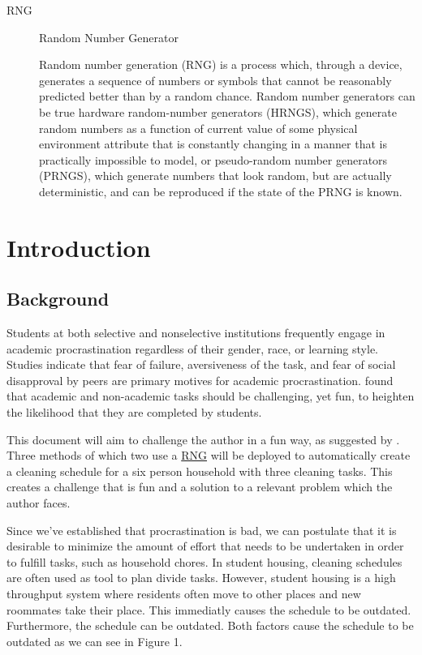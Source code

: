 \documentclass[openany]{book}
\begin{document}
\begin{description}
\item[\protect\hypertarget{rng}{}{RNG}]
Random Number Generator

Random number generation (RNG) is a process which, through a device, generates a sequence of numbers or symbols that cannot be reasonably predicted better than by a random chance. Random number generators can be true hardware random-number generators (HRNGS), which generate random numbers as a function of current value of some physical environment attribute that is constantly changing in a manner that is practically impossible to model, or pseudo-random number generators (PRNGS), which generate numbers that look random, but are actually deterministic, and can be reproduced if the state of the PRNG is known.
\end{description}

\hypertarget{intro}{%
\chapter{Introduction}\label{intro}}

\hypertarget{background}{%
\section{Background}\label{background}}

Students at both selective and nonselective institutions frequently engage in academic procrastination regardless of their gender, race, or learning style. Studies indicate that fear of failure, aversiveness of the task, and fear of social disapproval by peers are primary motives for academic procrastination. \cite{einstein} found that academic and non-academic tasks should be challenging, yet fun, to heighten the likelihood that they are completed by students.

This document will aim to challenge the author in a fun way, as suggested by \cite{einstein}. Three methods of which two use a \protect\hyperlink{rng}{RNG} will be deployed to automatically create a cleaning schedule for a six person household with three cleaning tasks. This creates a challenge that is fun and a solution to a relevant problem which the author faces.

Since we've established that procrastination is bad, we can postulate that it is desirable to minimize the amount of effort that needs to be undertaken in order to fulfill tasks, such as household chores. In student housing, cleaning schedules are often used as tool to plan divide tasks. However, student housing is a high throughput system where residents often move to other places and new roommates take their place. This immediatly causes the schedule to be outdated. Furthermore, the schedule can be outdated. Both factors cause the schedule to be outdated as we can see in Figure 1.
\end{document}
